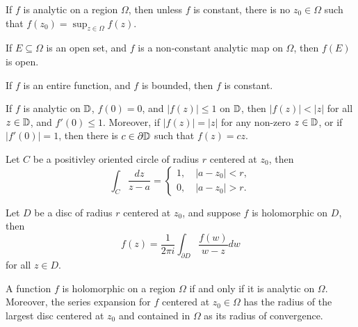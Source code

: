 \documentclass[12pt]{article}
\begin{document}
\begin{sats}
    If $f$ is analytic on a region $\Omega$, then unless $f$ is constant, there is no $z_0\in\Omega$ such that $f(z_0)=\sup_{z\in\Omega} f(z)$.
\end{sats}

\begin{sats}
    If $E\subseteq \Omega$ is an open set, and $f$ is a non-constant analytic map on $\Omega$, then $f(E)$ is open. 
\end{sats}

\begin{sats}[Liouville $*$]
    If $f$ is an entire function, and $f$ is bounded, then $f$ is constant.
\end{sats}

\begin{sats}
    If $f$ is analytic on $\mathbb{D}$, $f(0)=0$, and $|f(z)|\leq 1$ on $\mathbb{D}$, then $|f(z)|<|z|$ for all $z\in\mathbb{D}$, and $f'(0)\leq 1$. Moreover, if $|f(z)|=|z|$ for any non-zero $z\in \mathbb{D}$, or if $|f'(0)|=1$, then there is $c\in\partial \mathbb{D}$ such that $f(z)=cz$.  
\end{sats}

\begin{sats}[$*$]
    Let $C$ be a positivley oriented circle of radius $r$ centered at $z_0$, then
    \begin{equation*}
        \int_C \frac{dz}{z-a}=\begin{cases}
            1,\quad |a-z_0|<r,\\
            0,\quad |a-z_0|>r.
        \end{cases}
    \end{equation*}
\end{sats}

\begin{sats}
    Let $D$ be a disc of radius $r$ centered at $z_0$, and suppose $f$ is holomorphic on $D$, then $$f(z)=\frac{1}{2\pi i}\int_{\partial D} \frac{f(w)}{w-z}dw$$ for all $z\in D$. 
\end{sats}

\begin{sats}
    A function $f$ is holomorphic on a region $\Omega$ if and only if it is analytic on $\Omega$. Moreover, the series expansion for $f$ centered at $z_0\in \Omega$ has the radius of the largest disc centered at $z_0$ and contained in $\Omega$ as its radius of convergence.
\end{sats}
\end{document}
